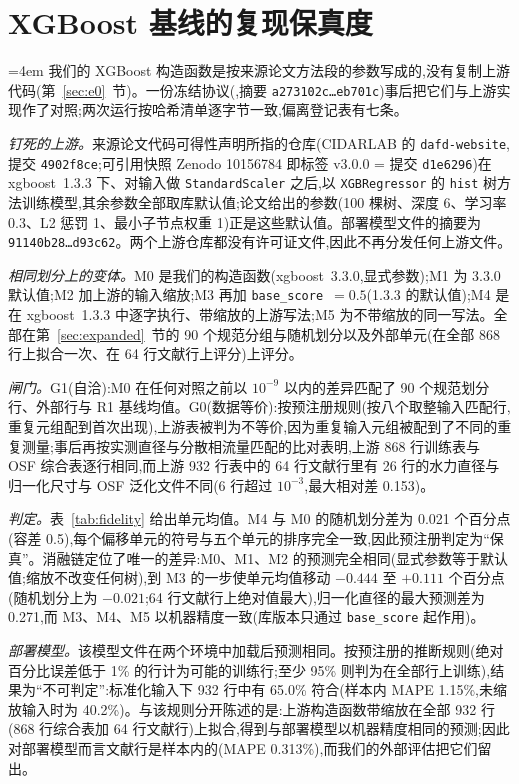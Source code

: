 \documentclass[11pt,a4paper]{ctexart}
\newcommand{\hashtrunc}[2]{\texttt{#1\ldots#2}}
\begin{document}
\clearpage
\section{XGBoost 基线的复现保真度}
\label{app:fidelity}
\begingroup\emergencystretch=4em\relax
我们的 XGBoost 构造函数是按来源论文方法段的参数写成的,没有复制上游代码(第~\ref{sec:e0}~节)。一份冻结协议(,摘要 \hashtrunc{a273102c}{eb701c})事后把它们与上游实现作了对照;两次运行按哈希清单逐字节一致,偏离登记表有七条。

\emph{钉死的上游。}来源论文代码可得性声明所指的仓库(CIDARLAB 的 \texttt{dafd-website},提交 \texttt{4902f8ce};可引用快照 Zenodo 10156784 即标签 v3.0.0 = 提交 \texttt{d1e6296})在 xgboost~1.3.3 下、对输入做 \texttt{StandardScaler} 之后,以 \texttt{XGBRegressor} 的 \texttt{hist} 树方法训练模型,其余参数全部取库默认值;论文给出的参数(100 棵树、深度 6、学习率 0.3、L2 惩罚 1、最小子节点权重 1)正是这些默认值。部署模型文件的摘要为 \hashtrunc{91140b28}{d93c62}。两个上游仓库都没有许可证文件,因此不再分发任何上游文件。

\emph{相同划分上的变体。}M0 是我们的构造函数(xgboost~3.3.0,显式参数);M1 为 3.3.0 默认值;M2 加上游的输入缩放;M3 再加 \texttt{base\_\allowbreak score}~$=0.5$(1.3.3 的默认值);M4 是在 xgboost~1.3.3 中逐字执行、带缩放的上游写法;M5 为不带缩放的同一写法。全部在第~\ref{sec:expanded}~节的 90 个规范分组与随机划分以及外部单元(在全部 868 行上拟合一次、在 64 行文献行上评分)上评分。

\emph{闸门。}G1(自洽):M0 在任何对照之前以 $10^{-9}$ 以内的差异匹配了 90 个规范划分行、外部行与 R1 基线均值。G0(数据等价):按预注册规则(按八个取整输入匹配行,重复元组配到首次出现),上游表被判为不等价,因为重复输入元组被配到了不同的重复测量;事后再按实测直径与分散相流量匹配的比对表明,上游 868 行训练表与 OSF 综合表逐行相同,而上游 932 行表中的 64 行文献行里有 26 行的水力直径与归一化尺寸与 OSF 泛化文件不同(6 行超过 $10^{-3}$,最大相对差 0.153)。

\emph{判定。}表~\ref{tab:fidelity} 给出单元均值。M4 与 M0 的随机划分差为 0.021 个百分点(容差 0.5),每个偏移单元的符号与五个单元的排序完全一致,因此预注册判定为“保真”。消融链定位了唯一的差异:M0、M1、M2 的预测完全相同(显式参数等于默认值;缩放不改变任何树),到 M3 的一步使单元均值移动 $-0.444$ 至 $+0.111$ 个百分点(随机划分上为 $-0.021$;64 行文献行上绝对值最大),归一化直径的最大预测差为 0.271,而 M3、M4、M5 以机器精度一致(库版本只通过 \texttt{base\_\allowbreak score} 起作用)。

\emph{部署模型。}该模型文件在两个环境中加载后预测相同。按预注册的推断规则(绝对百分比误差低于 1\% 的行计为可能的训练行;至少 95\% 则判为在全部行上训练),结果为“不可判定”:标准化输入下 932 行中有 65.0\% 符合(样本内 MAPE 1.15\%,未缩放输入时为 40.2\%)。与该规则分开陈述的是:上游构造函数带缩放在全部 932 行(868 行综合表加 64 行文献行)上拟合,得到与部署模型以机器精度相同的预测;因此对部署模型而言文献行是样本内的(MAPE 0.313\%),而我们的外部评估把它们留出。
\end{document}
